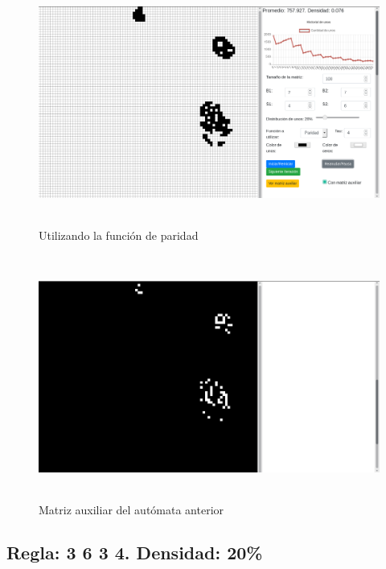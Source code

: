 \documentclass[12pt, titlepage]{article}
\begin{document}
\begin{figure}[H]
\begin{center}
 \includegraphics[width=15cm, height=8cm]{./img/2746-paridad.png}
 \caption{Utilizando la función de paridad}
 \label{fig:2746-paridad}
\end{center}
\end{figure}

\begin{figure}[H]
\begin{center}
 \includegraphics[width=15cm, height=8cm]{./img/2746-paridad-aux.png}
 \caption{Matriz auxiliar del autómata anterior}
 \label{fig:2746-paridad-aux}
\end{center}
\end{figure}

\subsection{Regla: 3 6 3 4. Densidad: 20\%}
\end{document}
